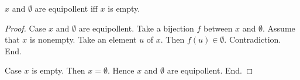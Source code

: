 \documentclass[../../basic-notions.ftl.tex]{subfiles}
\begin{document}
\begin{forthel}
    \begin{proposition}\label{SetTheory_02_06_430789}
      $x$ and $\emptyset$ are equipollent iff $x$ is empty.
    \end{proposition}
    \begin{proof}
      Case $x$ and $\emptyset$ are equipollent.
        Take a bijection $f$ between $x$ and $\emptyset$.
        Assume that $x$ is nonempty.
        Take an element $u$ of $x$.
        Then $f(u) \in \emptyset$.
        Contradiction.
      End.

      Case $x$ is empty.
        Then $x = \emptyset$.
        Hence $x$ and $\emptyset$ are equipollent.
      End.
    \end{proof}
  \end{forthel}
\end{document}
